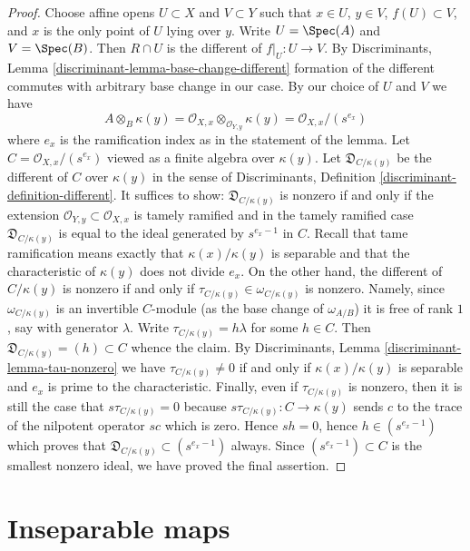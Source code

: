 \begin{proof}
\medskip\noindent
Choose affine opens $U \subset X$ and $V \subset Y$
such that $x \in U$, $y \in V$, $f(U) \subset V$, and $x$ is the only
point of $U$ lying over $y$. Write $U = \Spec(A)$ and $V = \Spec(B)$.
Then $R \cap U$ is the different of $f|_U : U \to V$.
By Discriminants, Lemma \ref{discriminant-lemma-base-change-different}
formation of the different commutes with arbitrary base change
in our case. By our choice of $U$ and $V$ we have
$$
A \otimes_B \kappa(y) =
\mathcal{O}_{X, x} \otimes_{\mathcal{O}_{Y, y}} \kappa(y) =
\mathcal{O}_{X, x}/(s^{e_x})
$$
where $e_x$ is the ramification index as in the statement of the lemma.
Let $C = \mathcal{O}_{X, x}/(s^{e_x})$ viewed as a finite algebra
over $\kappa(y)$. Let $\mathfrak{D}_{C/\kappa(y)}$ be the different
of $C$ over $\kappa(y)$ in the sense of
Discriminants, Definition \ref{discriminant-definition-different}.
It suffices to show: $\mathfrak{D}_{C/\kappa(y)}$
is nonzero if and only if the extension
$\mathcal{O}_{Y, y} \subset \mathcal{O}_{X, x}$ is tamely ramified
and in the tamely ramified case $\mathfrak{D}_{C/\kappa(y)}$
is equal to the ideal generated by $s^{e_x - 1}$ in $C$.
Recall that tame ramification means exactly that $\kappa(x)/\kappa(y)$
is separable and that the characteristic of $\kappa(y)$ does not
divide $e_x$. On the other hand, the different of $C/\kappa(y)$ is nonzero
if and only if $\tau_{C/\kappa(y)} \in \omega_{C/\kappa(y)}$ is nonzero.
Namely, since $\omega_{C/\kappa(y)}$ is an invertible $C$-module
(as the base change of $\omega_{A/B}$)
it is free of rank $1$, say with generator $\lambda$. Write
$\tau_{C/\kappa(y)} = h\lambda$ for some $h \in C$. Then
$\mathfrak{D}_{C/\kappa(y)} = (h) \subset C$ whence the claim.
By Discriminants, Lemma \ref{discriminant-lemma-tau-nonzero}
we have $\tau_{C/\kappa(y)} \not = 0$
if and only if $\kappa(x)/\kappa(y)$
is separable and $e_x$ is prime to the characteristic.
Finally, even if $\tau_{C/\kappa(y)}$ is nonzero, then
it is still the case that $s \tau_{C/\kappa(y)} = 0$
because $s\tau_{C/\kappa(y)} : C \to \kappa(y)$
sends $c$ to the trace of the nilpotent operator $sc$ which is zero.
Hence $sh = 0$, hence $h \in (s^{e_x - 1})$ which proves
that $\mathfrak{D}_{C/\kappa(y)} \subset (s^{e_x - 1})$ always.
Since $(s^{e_x - 1}) \subset C$ is the smallest nonzero ideal,
we have proved the final assertion.
\end{proof}






\section{Inseparable maps}
\label{section-inseparable}


